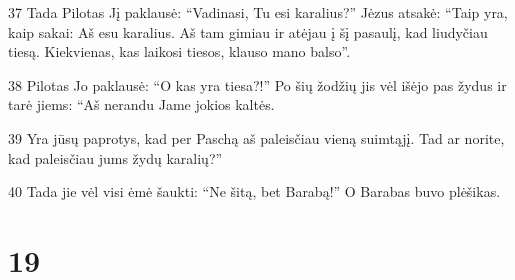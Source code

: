 \par 37 Tada Pilotas Jį paklausė: “Vadinasi, Tu esi karalius?” Jėzus atsakė: “Taip yra, kaip sakai: Aš esu karalius. Aš tam gimiau ir atėjau į šį pasaulį, kad liudyčiau tiesą. Kiekvienas, kas laikosi tiesos, klauso mano balso”. 
\par 38 Pilotas Jo paklausė: “O kas yra tiesa?!” Po šių žodžių jis vėl išėjo pas žydus ir tarė jiems: “Aš nerandu Jame jokios kaltės. 
\par 39 Yra jūsų paprotys, kad per Paschą aš paleisčiau vieną suimtąjį. Tad ar norite, kad paleisčiau jums žydų karalių?” 
\par 40 Tada jie vėl visi ėmė šaukti: “Ne šitą, bet Barabą!” O Barabas buvo plėšikas.


\chapter{19}



